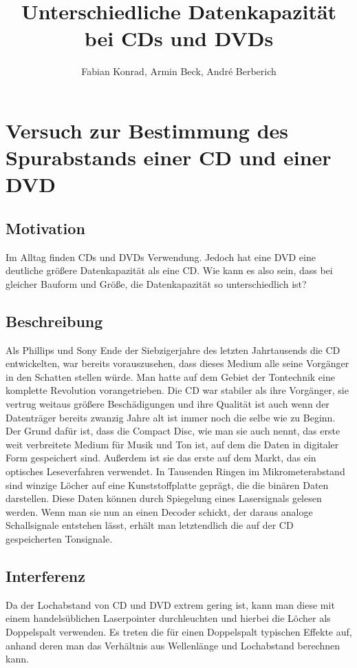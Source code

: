 \documentclass{scrreprt}
\author{Fabian Konrad, Armin Beck, André Berberich}
\title{Unterschiedliche Datenkapazität bei CDs und DVDs}
\begin{document}
\maketitle
\newpage

\chapter{Versuch zur Bestimmung des Spurabstands einer CD und einer DVD}

\section{Motivation}
Im Alltag finden CDs und DVDs Verwendung. Jedoch hat eine DVD eine deutliche größere Datenkapazität als eine CD. Wie kann es also sein, dass bei gleicher Bauform und Größe, die Datenkapazität so unterschiedlich ist?

\section{Beschreibung}
Als Phillips und Sony Ende der Siebzigerjahre des letzten Jahrtausends die CD entwickelten, war bereits vorauszusehen, dass dieses Medium alle seine Vorgänger in den Schatten stellen würde. Man hatte auf dem Gebiet der Tontechnik eine komplette Revolution vorangetrieben. Die CD war stabiler als ihre Vorgänger, sie vertrug weitaus größere Beschädigungen und ihre Qualität ist auch wenn der Datenträger bereits zwanzig Jahre alt ist immer noch die selbe wie zu Beginn. Der Grund dafür ist, dass die Compact Disc, wie man sie auch nennt, das erste weit verbreitete Medium für Musik und Ton ist, auf dem die Daten in digitaler Form gespeichert sind. Außerdem ist sie das erste auf dem Markt, das ein optisches Leseverfahren verwendet. In Tausenden Ringen im Mikrometerabstand sind winzige Löcher auf eine Kunststoffplatte geprägt, die die binären Daten darstellen. Diese Daten können durch Spiegelung eines Lasersignals gelesen werden. Wenn man sie nun an einen Decoder schickt, der daraus analoge Schallsignale entstehen lässt, erhält man letztendlich die auf der CD gespeicherten Tonsignale. 


\section{Interferenz}


 Da der Lochabstand von CD und DVD extrem gering ist, kann man diese mit einem handelsüblichen Laserpointer durchleuchten und hierbei die Löcher als Doppelspalt verwenden. Es treten die für einen Doppelspalt typischen Effekte auf, anhand deren man das Verhältnis aus Wellenlänge und Lochabstand berechnen kann.
\end{document}
